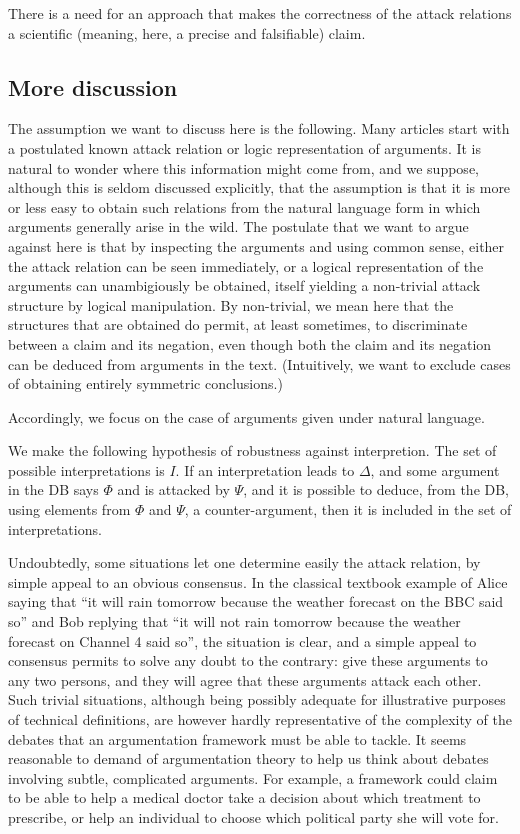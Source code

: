 \documentclass[version=3.21, pagesize, twoside=off, bibliography=totoc, DIV=calc, fontsize=12pt, a4paper, french, english]{scrartcl}
\begin{document}
There is a need for an approach that makes the correctness of the attack relations a scientific (meaning, here, a precise and falsifiable) claim.

\subsection{More discussion}

The assumption we want to discuss here is the following.
Many articles start with a postulated known attack relation or logic representation of arguments. It is natural to wonder where this information might come from, and we suppose, although this is seldom discussed explicitly, that the assumption is that it is more or less easy to obtain such relations from the natural language form in which arguments generally arise in the wild. 
The postulate that we want to argue against here is that by inspecting the arguments and using common sense, either the attack relation can be seen immediately, or a logical representation of the arguments can unambigiously be obtained, itself yielding a non-trivial attack structure by logical manipulation.
By non-trivial, we mean here that the structures that are obtained do permit, at least sometimes, to discriminate between a claim and its negation, even though both the claim and its negation can be deduced from arguments in the text. (Intuitively, we want to exclude cases of obtaining entirely symmetric conclusions.)

Accordingly, we focus on the case of arguments given under natural language. 

We make the following hypothesis of robustness against interpretion. The set of possible interpretations is $I$. If an interpretation leads to $\Delta$, and some argument in the DB says $\Phi$ and is attacked by $\Psi$, and it is possible to deduce, from the DB, using elements from $\Phi$ and $\Psi$, a counter-argument, then it is included in the set of interpretations.

Undoubtedly, some situations let one determine easily the attack relation, by simple appeal to an obvious consensus. In the classical textbook example of Alice saying that “it will rain tomorrow because the weather forecast on the BBC said so” and Bob replying that “it will not rain tomorrow because the weather forecast on Channel 4 said so”, the situation is clear, and a simple appeal to consensus permits to solve any doubt to the contrary: give these arguments to any two persons, and they will agree that these arguments attack each other. Such trivial situations, although being possibly adequate for illustrative purposes of technical definitions, are however hardly representative of the complexity of the debates that an argumentation framework must be able to tackle. It seems reasonable to demand of argumentation theory to help us think about debates involving subtle, complicated arguments. For example, a framework could claim to be able to help a medical doctor take a decision about which treatment to prescribe, or help an individual to choose which political party she will vote for.
\end{document}

